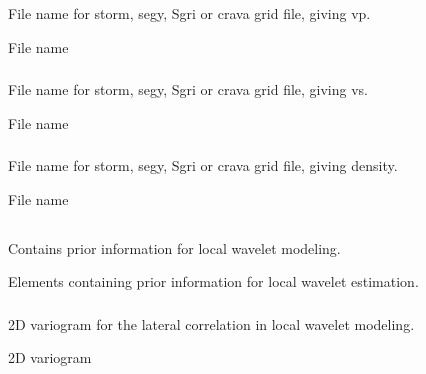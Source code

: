 \subsubsection{}
 \slist
   \item \Description File name for storm, segy, Sgri or crava grid file, giving vp.
   \item \Argument File name
   \item \Default
 \elist

\subsubsection{}
 \slist
   \item \Description File name for storm, segy, Sgri or crava grid file, giving vs.
   \item \Argument File name
   \item \Default
 \elist

\subsubsection{}
 \slist
   \item \Description File name for storm, segy, Sgri or crava grid file, giving density.
   \item \Argument File name
   \item \Default
 \elist

\subsection{}
 \slist
   \item \Description Contains prior information for local wavelet modeling.
   \item \Argument Elements containing prior information for local wavelet estimation.
   \item \Default
 \elist

\subsubsection{}
 \slist
   \item \Description 2D variogram for the lateral correlation in local wavelet  modeling.
   \item \Argument 2D variogram
   \item \Default
 \elist

